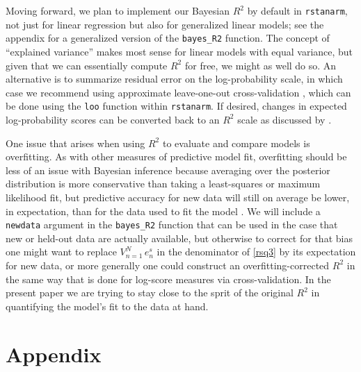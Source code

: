 \documentclass[11pt]{article}
\begin{document}
Moving forward, we plan to implement our Bayesian $R^2$ by default in
{\tt rstanarm}, not just for linear regression but also for generalized linear
models; see the appendix for a generalized version of the
\verb#bayes_R2# function. The concept of ``explained variance'' makes most
sense for linear models with equal variance, but given that we can essentially
compute $R^2$ for free, we might as well do so.  An alternative is to summarize
residual error on the log-probability scale, in which case we recommend using
approximate leave-one-out cross-validation \citep{VehtariGelmanGabry2017},
which can be done using the {\tt loo} function within {\tt rstanarm}.
If desired, changes in expected log-probability scores can be converted back to
an $R^2$ scale as discussed by \cite{Nagelkerke1991}.

One issue that arises when using $R^2$ to evaluate and compare models is
overfitting.  As with other measures of predictive model fit, overfitting should
be less of an issue with Bayesian inference because averaging over the posterior
distribution is more conservative than taking a least-squares or maximum
likelihood fit, but predictive accuracy for new data will still on average be
lower, in expectation, than for the data used to fit the model
\citep{GelmanHwangVehtari2014}. We will include a {\tt newdata} argument in the
\verb#bayes_R2# function  that can be used in the case that new or held-out data
are actually available, but otherwise to correct for that bias one might want to
replace $V_{n=1}^N \,e_n^s$ in the denominator of \eqref{rsq3} by its expectation
for new data, or more generally one could construct an overfitting-corrected
$R^2$ in the same way that is done for log-score measures via cross-validation.
In the present paper we are trying to stay close to the sprit of the original
$R^2$ in quantifying the model's fit to the data at hand.







\clearpage
\section*{Appendix}
\end{document}
